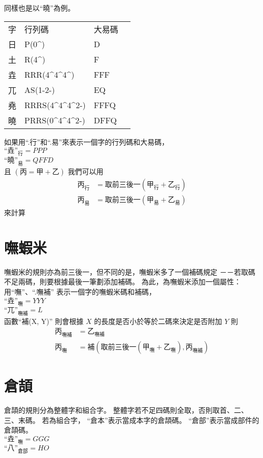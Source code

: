 \documentclass{article}
\def\tac{\textasciicircum}
\begin{document}
同樣也是以``曉''為例。
\begin{tabular}{llll}
字  & 行列碼 & 大易碼\\
日  & P(0\tac) & D\\
土  & R(4\tac) & F\\
垚  & RRR(4\tac4\tac4\tac) & FFF\\
兀  & AS(1-2-) & EQ\\
堯  & RRRS(4\tac4\tac4\tac2-) & FFFQ\\
曉  & PRRS(0\tac4\tac4\tac2-) & DFFQ\\
\end{tabular}

如果用``.行''和``.易''來表示一個字的行列碼和大易碼，\\
$\mbox{``垚''}_{\mbox{行}}=PPP$\\
$\mbox{``曉''}_{\mbox{易}}=QFFD$\\
且 $(\mbox{丙}=\mbox{甲}+\mbox{乙})$
我們可以用
\begin{subequations}
  \begin{align}
  \mbox{丙}_{\mbox{行}}&=\mbox{取前三後一}(\mbox{甲}_{\mbox{行}}+\mbox{乙}_{\mbox{行}})\\
  \mbox{丙}_{\mbox{易}}&=\mbox{取前三後一}(\mbox{甲}_{\mbox{易}}+\mbox{乙}_{\mbox{易}})
  \end{align}
\end{subequations}
來計算

\section{嘸蝦米}
嘸蝦米的規則亦為前三後一，但不同的是，嘸蝦米多了一個補碼規定
－－若取碼不足兩碼，則要根據最後一筆劃添加補碼。
為此，為嘸蝦米添加一個屬性：
用``嘸''、``.嘸補'' 表示一個字的嘸蝦米碼和補碼，\\
$\mbox{``垚''}_{\mbox{嘸}}=YYY$\\
$\mbox{``兀''}_{\mbox{嘸補}}=L$\\
函數``\mbox{補}(X, Y)'' 則會根據 $X$ 的長度是否小於等於二碼來決定是否附加 $Y$
則
\begin{subequations}
  \begin{align}
  \mbox{丙}_{\mbox{嘸補}}&=\mbox{乙}_{\mbox{嘸補}}\\
  \mbox{丙}_{\mbox{嘸}}&=\mbox{補}(\mbox{取前三後一}(\mbox{甲}_{\mbox{嘸}}+\mbox{乙}_{\mbox{嘸}}),
                          \mbox{丙}_{\mbox{嘸補}})
  \end{align}
\end{subequations}
\section{倉頡}
倉頡的規則分為整體字和組合字。
整體字若不足四碼則全取，否則取首、二、三、末碼。
若為組合字，
``倉本''表示當成本字的倉頡碼。
``倉部''表示當成部件的倉頡碼。\\
$\mbox{``垚''}_{\mbox{嘸}}=GGG$\\
$\mbox{``八''}_{\mbox{倉部}}=HO$\\
\end{document}
